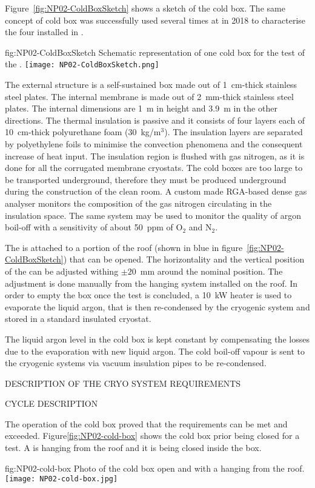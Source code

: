 Figure~\ref{fig:NP02-ColdBoxSketch} shows a sketch of the cold box.
The same concept of cold box was successfully used several times at  in 2018 to characterise the four  installed in .
\begin{dunefigure}{fig:NP02-ColdBoxSketch}
{Schematic representation of one cold box for the test of the .}
\texttt{[image: NP02-ColdBoxSketch.png]}
\end{dunefigure}
The external structure is a self-sustained box made out of 1~cm-thick stainless steel plates.
The internal membrane is made out of 2~mm-thick stainless steel plates.
The internal dimensions are 1~m in height and 3.9~m in the other directions.
The thermal insulation is passive and it consists of four layers each of 10~cm-thick polyurethane foam (30~kg/m$^3$).
The insulation layers are separated by polyethylene foils to minimise the convection phenomena and the consequent increase of heat input.
The insulation region is flushed with gas nitrogen, as it is done for all the corrugated membrane cryostats.
The cold boxes are too large to be transported underground, therefore they must be produced underground during the construction of the clean room.
A custom made RGA-based dense gas analyser monitors the composition of the gas nitrogen circulating in the insulation space.
The same system may be used to monitor the quality of argon boil-off with a sensitivity of about 50~ppm of O$_2$ and N$_2$.

The  is attached to a portion of the roof (shown in blue in figure~\ref{fig:NP02-ColdBoxSketch}) that can be opened.
The horizontality and the vertical position of the  can be adjusted withing $\pm 20$~mm around the nominal position.
The adjustment is done manually from the hanging system installed on the roof.
In order to empty the box once the test is concluded, a 10~kW heater is used to evaporate the liquid argon, that is then re-condensed by the cryogenic system and stored in a standard insulated cryostat.

The liquid argon level in the cold box is kept constant by compensating the losses due to the evaporation with new liquid argon.
The cold boil-off vapour is sent to the cryogenic systems via vacuum insulation pipes to be re-condensed.

DESCRIPTION OF THE CRYO SYSTEM REQUIREMENTS

CYCLE DESCRIPTION

The operation of the  cold box proved that the requirements can be met and exceeded.
Figure\ref{fig:NP02-cold-box} shows the  cold box prior being closed for a test.
A  is hanging from the roof and it is being closed inside the box.
\begin{dunefigure}{fig:NP02-cold-box}
{Photo of the  cold box open and with a  hanging from the roof.}
\texttt{[image: NP02-cold-box.jpg]}
\end{dunefigure}

